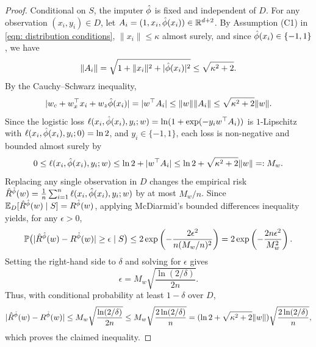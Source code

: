 \begin{proof}
Conditional on $S$, the imputer $\hat{\phi}$ is fixed and independent of $D$. For any observation $(x_i, y_i) \in D$, let $A_i = (1, x_i, \hat{\phi}(x_i)) \in \mathbb{R}^{d+2}$. By Assumption (C1) in \eqref{eqn: distribution conditions}, $\|x_i\| \le \kappa$ almost surely, and since $\hat{\phi}(x_i) \in \{-1, 1\}$, we have
\[
\|A_i\| = \sqrt{1 + \|x_i\|^2 + |\hat{\phi}(x_i)|^2} \le \sqrt{\kappa^2 + 2}.
\]
By the Cauchy--Schwarz inequality,
\[
|w_c + w_x^\top x_i + w_z\hat{\phi}(x_i)| = |w^\top A_i| \le \|w\| \|A_i\| \le \sqrt{\kappa^2 + 2}\|w\|.
\]
Since the logistic loss $\ell(x_i, \hat{\phi}(x_i), y_i; w) = \ln(1 + \exp(-y_i w^\top A_i))$ is $1$-Lipschitz with $\ell(x_i, \hat{\phi}(x_i), y_i; 0) = \ln 2$, and $y_i \in \{-1, 1\}$, each loss is non-negative and bounded almost surely by
\[
0 \le \ell(x_i, \hat{\phi}(x_i), y_i; w) \le \ln 2 + |w^\top A_i| \le \ln 2 + \sqrt{\kappa^2 + 2}\|w\| =: M_w.
\]
Replacing any single observation in $D$ changes the empirical risk $\hat{R}^{\hat{\phi}}(w) = \frac{1}{n} \sum_{i=1}^n \ell(x_i, \hat{\phi}(x_i), y_i; w)$ by at most $M_w/n$. Since $\mathbb{E}_D[\hat{R}^{\hat{\phi}}(w) \mid S] = R^{\hat{\phi}}(w)$, applying McDiarmid's bounded differences inequality yields, for any $\epsilon > 0$,
\[
\mathbb{P}\big( |\hat{R}^{\hat{\phi}}(w) - R^{\hat{\phi}}(w)| \ge \epsilon \mid S \big) \le 2\exp\left(-\frac{2\epsilon^2}{n(M_w/n)^2}\right) = 2\exp\left(-\frac{2n\epsilon^2}{M_w^2}\right).
\]
Setting the right-hand side to $\delta$ and solving for $\epsilon$ gives
\[
\epsilon = M_w \sqrt{\frac{\ln(2/\delta)}{2n}}.
\]
Thus, with conditional probability at least $1 - \delta$ over $D$,
\[
|\hat{R}^{\hat{\phi}}(w) - R^{\hat{\phi}}(w)| \le M_w \sqrt{\frac{\ln(2/\delta)}{2n}} \le M_w \sqrt{\frac{2\ln(2/\delta)}{n}} = (\ln 2 + \sqrt{\kappa^2 + 2}\|w\|)\sqrt{\frac{2\ln(2/\delta)}{n}},
\]
which proves the claimed inequality.
\end{proof}


